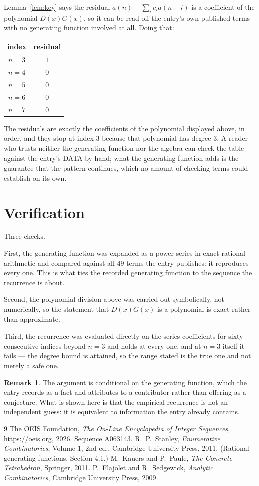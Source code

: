 \documentclass[11pt,a4paper]{article}
\theoremstyle{plain}
\theoremstyle{definition}
\newtheorem{remark}[theorem]{Remark}
\begin{document}
Lemma~\ref{lem:key} says the residual $a(n)-\sum_ic_ia(n-i)$ is a coefficient of the
polynomial $D(x)G(x)$, so it can be read off the entry's own published terms with no
generating function involved at all. Doing that:
\begin{center}
\begin{tabular}{cc}
index & residual \\ \hline
$n=3$ & $1$ \\
$n=4$ & $0$ \\
$n=5$ & $0$ \\
$n=6$ & $0$ \\
$n=7$ & $0$
\end{tabular}
\end{center}
The residuals are exactly the coefficients of the polynomial displayed above, in order, and
they stop at index $3$ because that polynomial has degree $3$. A reader who trusts
neither the generating function nor the algebra can check the table against the entry's DATA
by hand; what the generating function adds is the guarantee that the pattern continues, which
no amount of checking terms could establish on its own.

\section{Verification}

Three checks.

First, the generating function was expanded as a power series in exact rational arithmetic and
compared against all $49$ terms the entry publishes: it reproduces every one. This is
what ties the recorded generating function to the sequence the recurrence is about.

Second, the polynomial division above was carried out symbolically, not numerically, so the
statement that $D(x)G(x)$ is a polynomial is exact rather than approximate.

Third, the recurrence was evaluated directly on the series coefficients for sixty consecutive
indices beyond $n=3$ and holds at every one, and at $n=3$ itself it fails --- the
degree bound is attained, so the range stated is the true one and not merely a safe one.

\begin{remark}
The argument is conditional on the generating function, which the entry records as a fact and
attributes to a contributor rather than offering as a conjecture. What is shown here is that
the empirical recurrence is not an independent guess: it is equivalent to information the
entry already contains.
\end{remark}

\begin{thebibliography}{9}
 The OEIS Foundation, \emph{The On-Line Encyclopedia of Integer
Sequences}, \url{https://oeis.org}, 2026. Sequence A063143.
 R.~P.~Stanley, \emph{Enumerative Combinatorics}, Volume 1, 2nd ed.,
Cambridge University Press, 2011. (Rational generating functions, Section 4.1.)
 M.~Kauers and P.~Paule, \emph{The Concrete Tetrahedron}, Springer, 2011.
 P.~Flajolet and R.~Sedgewick, \emph{Analytic Combinatorics}, Cambridge
University Press, 2009.
\end{thebibliography}
\end{document}
